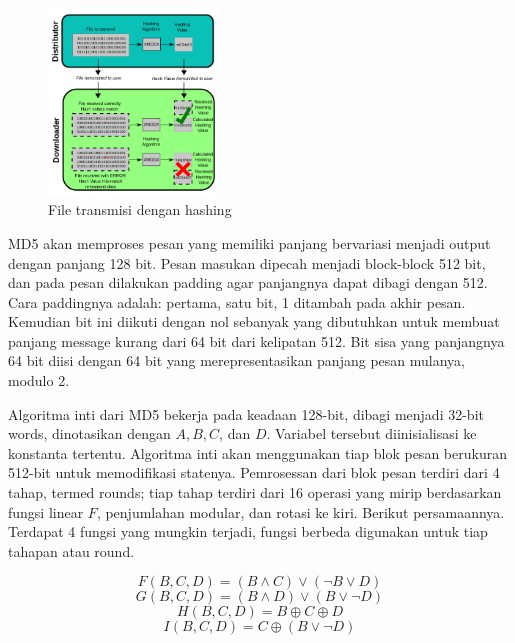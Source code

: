 \begin{figure} [ht]
  \centering
  \includegraphics[width=0.4\textwidth]{gambar/hashing-file-transmission.png}

  \caption{File transmisi dengan hashing}
  \label{fig:hashingfiletransmission}
\end{figure}

MD5 akan memproses pesan yang memiliki panjang bervariasi menjadi output dengan panjang 128 bit. Pesan masukan dipecah menjadi block-block 512 bit, dan pada pesan dilakukan padding agar panjangnya dapat dibagi dengan 512. Cara paddingnya adalah: pertama, satu bit, 1 ditambah pada akhir pesan. Kemudian bit ini diikuti dengan nol sebanyak yang dibutuhkan untuk membuat panjang message kurang dari 64 bit dari kelipatan 512. Bit sisa yang panjangnya 64 bit diisi dengan 64 bit yang merepresentasikan panjang pesan mulanya, modulo 2.

Algoritma inti dari MD5 bekerja pada keadaan 128-bit, dibagi menjadi 32-bit words, dinotasikan dengan \(A, B, C\), dan \(D\). Variabel tersebut diinisialisasi ke konstanta tertentu. Algoritma inti akan menggunakan tiap blok pesan berukuran 512-bit untuk memodifikasi statenya. Pemrosessan dari blok pesan terdiri dari 4 tahap, termed rounds; tiap tahap terdiri dari 16 operasi yang mirip berdasarkan fungsi linear \(F\), penjumlahan modular, dan rotasi ke kiri. Berikut persamaannya. Terdapat 4 fungsi yang mungkin terjadi, fungsi berbeda digunakan untuk tiap tahapan atau round.

\label{eq:md5sum}
\[ F(B,C,D) = (B \land C) \lor (\neg B \lor D) \]
\[ G(B,C,D) = (B \land D) \lor (B \lor \neg D) \]
\[ H(B,C,D) = B \oplus C \oplus D \]
\[ I(B,C,D) = C \oplus (B \lor \neg D) \]



